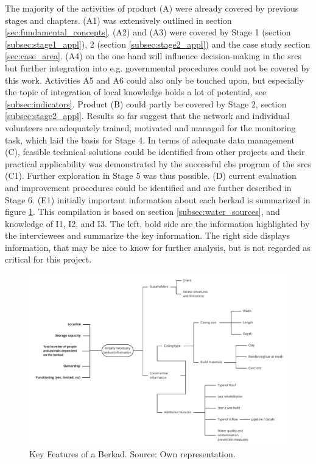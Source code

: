 The majority of the activities of product (A) were already covered by previous stages and chapters. (A1) was extensively outlined in section \ref{sec:fundamental_concepts}. (A2) and (A3) were covered by Stage 1 (section \ref{subsec:stage1_appl}), 2 (section \ref{subsec:stage2_appl}) and the case study section \ref{sec:case_area}. (A4) on the one hand will influence decision-making in the \acrshort{srcs} but further integration into e.g. governmental procedures could not be covered by this work. Activities A5 and A6 could also only be touched upon, but especially the topic of integration of local knowledge holds a lot of potential, see \ref{subsec:indicators}.\newline
Product (B) could partly be covered by Stage 2, section \ref{subsec:stage2_appl}. Results so far suggest that the network and individual volunteers are adequately trained, motivated and managed for the monitoring task, which laid the basis for Stage 4. In terms of adequate data management (C), feasible technical solutions could be identified from other projects and their practical applicability was demonstrated by the successful \acrshort{cbs} program of the \acrshort{srcs} (C1). Further exploration in Stage 5 was thus possible. (D) current evaluation and improvement procedures could be identified and are further described in Stage 6.\newline
(E1) initially important information about each berkad is summarized in figure \ref{fig:res_berkad}. This compilation is based on section \ref{subsec:water_sources}, and knowledge of I1, I2, and I3. The left, bold side are the information highlighted by the interviewees and summarize the key information. The right side displays information, that may be nice to know for further analysis, but is not regarded as critical for this project.

\begin{figure}[!htp]
    \centering
    \includegraphics[width=1.0\textwidth]{figures/2023_MA_results_berkad.pdf}
    \decoRule
    \caption[Key Features of a Berkad]{Key Features of a Berkad. Source: Own representation.}
    \label{fig:res_berkad}
\end{figure}

